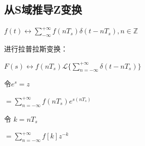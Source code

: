 \documentclass[UTF8]{ctexart}
\begin{document}
\subsection{从S域推导Z变换}
$f(t)\longleftrightarrow \sum_{-\infty }^{+\infty} f(nT_s)\delta (t-nT_s), n\in \mathbb{Z} $  \par
进行拉普拉斯变换：\par
$F(s)\longleftrightarrow  f(nT_s) \mathscr{L}\{\sum_{n=-\infty }^{+\infty}\delta (t-nT_s)\} $  \par
令$e^s=z$ \par
\qquad $=\sum_{n=-\infty }^{+\infty} f(nT_s)e^{s(nT_s)}$  \par
令 $k=nT_s$ \par 
\qquad $=\sum_{n=-\infty }^{+\infty} f[k]z^{-k}$  \par
\end{document}
